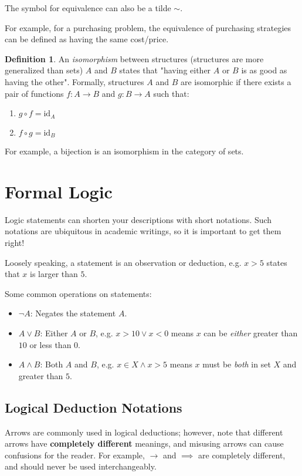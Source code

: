\documentclass[12pt]{article}
\theoremstyle{definition}
\newtheorem{defn}{Definition}[section]
\newcommand{\id}[1]{\text{id}_{#1}}
\begin{document}
 	The symbol for equivalence can also be a tilde $\sim$.
 	
 	For example, for a purchasing problem, the equivalence of purchasing strategies can be defined as having the same cost/price.
 	
 	\begin{defn}
 		An \emph{isomorphism} between structures (structures are more generalized than sets) $A$ and $B$ states that "having either $A$ or $B$ is as good as having the other". Formally, structures $A$ and $B$ are isomorphic if there exists a pair of functions $f : A \to B$ and $g : B \to A$ such that:
 		\begin{enumerate}
 			\item $g \circ f = \id{A}$
 			\item $f \circ g = \id{B}$
 		\end{enumerate}
 	\end{defn}
 	
 	For example, a bijection is an isomorphism in the category of sets.
 	
 	\section{Formal Logic}
 	
 	Logic statements can shorten your descriptions with short notations. Such notations are ubiquitous in academic writings, so it is important to get them right!
 	
 	Loosely speaking, a statement is an observation or deduction, e.g. $x > 5$ states that $x$ is larger than $5$.
 	
 	Some common operations on statements:
 	\begin{itemize}
 		\item $\lnot A$: Negates the statement $A$.
 		\item $A \lor B$: Either $A$ or $B$, e.g. $x > 10 \lor x < 0$ means $x$ can be \emph{either} greater than $10$ or less than $0$.
 		\item $A \land B$: Both $A$ and $B$, e.g. $x \in X \land x > 5$ means $x$ must be \emph{both} in set $X$ and greater than $5$.
 	\end{itemize}
 	
 	\subsection{Logical Deduction Notations}
 	
 	Arrows are commonly used in logical deductions; however, note that different arrows have \textbf{completely different} meanings, and misusing arrows can cause confusions for the reader. For example, $\to$ and $\implies$ are completely different, and should never be used interchangeably.
 	
\end{document}
